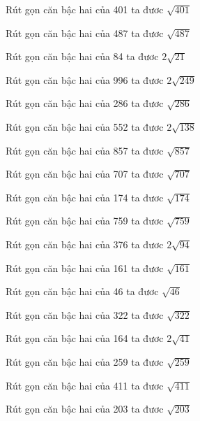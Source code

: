 \documentclass[12pt,a4paper]{article}
\begin{document}
\begin{ex}
Rút gọn căn bậc hai của 401 ta đươc $\sqrt{401}$
\end{ex}
\begin{ex}
Rút gọn căn bậc hai của 487 ta đươc $\sqrt{487}$
\end{ex}
\begin{ex}
Rút gọn căn bậc hai của 84 ta đươc $2\sqrt{21}$
\end{ex}
\begin{ex}
Rút gọn căn bậc hai của 996 ta đươc $2\sqrt{249}$
\end{ex}
\begin{ex}
Rút gọn căn bậc hai của 286 ta đươc $\sqrt{286}$
\end{ex}
\begin{ex}
Rút gọn căn bậc hai của 552 ta đươc $2\sqrt{138}$
\end{ex}
\begin{ex}
Rút gọn căn bậc hai của 857 ta đươc $\sqrt{857}$
\end{ex}
\begin{ex}
Rút gọn căn bậc hai của 707 ta đươc $\sqrt{707}$
\end{ex}
\begin{ex}
Rút gọn căn bậc hai của 174 ta đươc $\sqrt{174}$
\end{ex}
\begin{ex}
Rút gọn căn bậc hai của 759 ta đươc $\sqrt{759}$
\end{ex}
\begin{ex}
Rút gọn căn bậc hai của 376 ta đươc $2\sqrt{94}$
\end{ex}
\begin{ex}
Rút gọn căn bậc hai của 161 ta đươc $\sqrt{161}$
\end{ex}
\begin{ex}
Rút gọn căn bậc hai của 46 ta đươc $\sqrt{46}$
\end{ex}
\begin{ex}
Rút gọn căn bậc hai của 322 ta đươc $\sqrt{322}$
\end{ex}
\begin{ex}
Rút gọn căn bậc hai của 164 ta đươc $2\sqrt{41}$
\end{ex}
\begin{ex}
Rút gọn căn bậc hai của 259 ta đươc $\sqrt{259}$
\end{ex}
\begin{ex}
Rút gọn căn bậc hai của 411 ta đươc $\sqrt{411}$
\end{ex}
\begin{ex}
Rút gọn căn bậc hai của 203 ta đươc $\sqrt{203}$
\end{ex}
\end{document}
